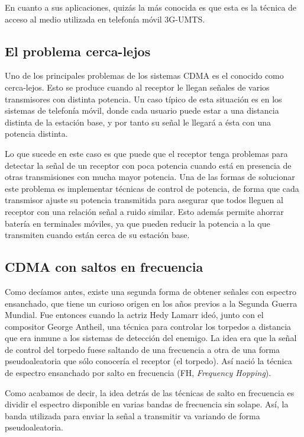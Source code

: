 \documentclass[es,apuntes]{uah}
\begin{document}
En cuanto a sus aplicaciones, quizás la más conocida es que esta es la técnica de acceso al medio utilizada en telefonía móvil 3G-UMTS.

\subsection{El problema cerca-lejos}

Uno de los principales problemas de los sistemas CDMA es el conocido como cerca-lejos. Esto se produce cuando al receptor le llegan señales de varios transmisores con distinta potencia. Un caso típico de esta situación es en los sistemas de telefonía móvil, donde cada usuario puede estar a una distancia distinta de la estación base, y por tanto su señal le llegará a ésta con una potencia distinta. 

Lo que sucede en este caso es que puede que el receptor tenga problemas para detectar la señal de un receptor con poca potencia cuando está en presencia de otras transmisiones con mucha mayor potencia. Una de las formas de solucionar este problema es implementar técnicas de control de potencia, de forma que cada transmisor ajuste su potencia transmitida para asegurar que todos lleguen al receptor con una relación señal a ruido similar. Esto además permite ahorrar batería en terminales móviles, ya que pueden reducir la potencia a la que transmiten cuando están cerca de su estación base. 

\subsection{CDMA con saltos en frecuencia}

Como decíamos antes, existe una segunda forma de obtener señales con espectro ensanchado, que tiene un curioso origen en los años previos a la Segunda Guerra Mundial. Fue entonces cuando la actriz Hedy Lamarr ideó, junto con el compositor George Antheil, una técnica para controlar los torpedos a distancia que era inmune a los sistemas de detección del enemigo. La idea era que la señal de control del torpedo fuese saltando de una frecuencia a otra de una forma pseudoaleatoria que sólo conocería el receptor (el torpedo). Así nació la técnica de espectro ensanchado por salto en frecuencia (FH, \emph{Frequency Hopping}). 

Como acabamos de decir, la idea detrás de las técnicas de salto en frecuencia es dividir el espectro disponible en varias bandas de frecuencia sin solape. Así, la banda utilizada para enviar la señal a transmitir va variando de forma pseudoaleatoria. 
\end{document}
